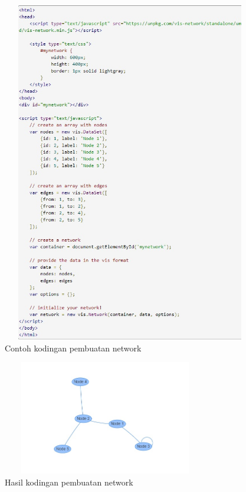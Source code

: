 \begin{figure}[H]
    \centering
    \includegraphics[width=12cm, height=15cm]{Gambar/network.jpg}
    \caption{Contoh kodingan pembuatan network}
    \label{fig:gambarNetwork}
\end{figure}

\begin{figure}[H]
    \centering
    \includegraphics[width=9cm, height=5cm]{Gambar/hasilNetwork.jpg}
    \caption{Hasil kodingan pembuatan network}
    \label{fig:gambarHasilNetwork}
\end{figure}


